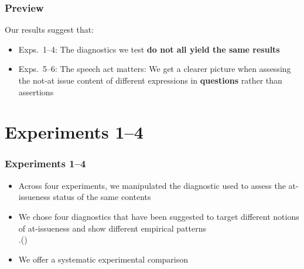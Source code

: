\documentclass[compress, xcolor = dvipsnames, aspectratio=169, handout]{beamer}
\begin{document}
	\begin{frame}\frametitle{Preview}
	
		Our results suggest that:
		\begin{itemize}
			\item Exps.~1–4: The diagnostics we test \textbf{do not all yield the same results}
			\item Exps.~5–6: The speech act matters: We get a clearer picture when assessing the not-at issue content of different expressions in \textbf{questions} rather than assertions
		\end{itemize}
	
	\end{frame}

\section{Experiments 1–4}
	\begin{frame}\frametitle{Experiments 1–4}
		\begin{itemize}
			\item Across four experiments, we manipulated the diagnostic used to assess the at-issueness status of the same contents\pause

			\item We chose four diagnostics that have been suggested to target different notions of at-issueness and show different empirical patterns\\ 
			\phantom.\hfill {\scriptsize(\citealt{snider_anaphoric_2017,snider_at-issueness_2017,snider_distinguishing_2018,koev_notions_2018,faller_discourse_2019,korotkova_evidential_2020})}\pause

			\item We offer a systematic experimental comparison

		\end{itemize}
			
	\end{frame}
\end{document}
